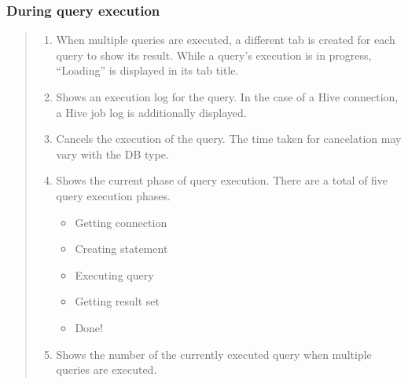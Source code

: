 \documentclass[letterpaper,10pt,english]{sphinxmanual}
\begin{document}
\subsubsection{During query execution}
\label{\detokenize{discovery/part06/06_03-use_a_workbench:id6}}\begin{quote}

\begin{figure}[H]
\centering

\noindent{}
\end{figure}
\begin{enumerate}
\def\theenumi{\arabic{enumi}}
\def\labelenumi{\theenumi .}
\makeatletter\def\p@enumii{\p@enumi \theenumi .}\makeatother
\item {} 
 When multiple queries are executed, a different tab is created for each query to show its result. While a query’s execution is in progress, “Loading” is displayed in its tab title.

\item {} 
 Shows an execution log for the query. In the case of a Hive connection, a Hive job log is additionally displayed.

\item {} 
 Cancels the execution of the query. The time taken for cancelation may vary with the DB type.

\item {} 
 Shows the current phase of query execution. There are a total of five query execution phases.
\begin{itemize}
\item {} 
Getting connection

\item {} 
Creating statement

\item {} 
Executing query

\item {} 
Getting result set

\item {} 
Done!

\end{itemize}

\item {} 
 Shows the number of the currently executed query when multiple queries are executed.


\end{enumerate}
\end{quote}
\end{document}
